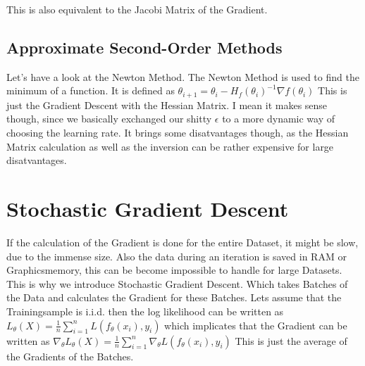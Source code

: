 \documentclass[a4paper]{article}
\begin{document}
This is also equivalent to the Jacobi Matrix of the Gradient. 

\subsection{Approximate Second-Order Methods}
Let's have a look at the Newton Method. The Newton Method is used to find the minimum of a function. It is defined as $\theta_{i+1} = \theta_{i} - H_{f}(\theta_{i})^{-1} \nabla f(\theta_{i})$ This is just the Gradient Descent with the Hessian Matrix. 
I mean it makes sense though, since we basically exchanged our shitty $\epsilon$ to a more dynamic way of choosing the learning rate. 
It brings some disatvantages though, as the Hessian Matrix calculation as well as the inversion can be rather expensive for large disatvantages. 

\section{Stochastic Gradient Descent}
If the calculation of the Gradient is done for the entire Dataset, it might be slow, due to the immense size. Also the data during an iteration is saved in RAM or Graphicsmemory, this can be become impossible to handle for large Datasets. This is why we introduce Stochastic Gradient Descent. Which takes Batches of the Data and calculates the Gradient for these Batches. 
Lets assume that the Trainingsample is i.i.d. then the log likelihood can be written as $L_{\theta}(X) = \frac{1}{n} \sum_{i=1}^{n} L(f_{\theta}(x_{i}),y_{i})$ which implicates that the Gradient can be written as $\nabla_{\theta} L_{\theta}(X) = \frac{1}{n} \sum_{i=1}^{n} \nabla_{\theta} L(f_{\theta}(x_{i}),y_{i})$ This is just the average of the Gradients of the Batches. 
\end{document}
